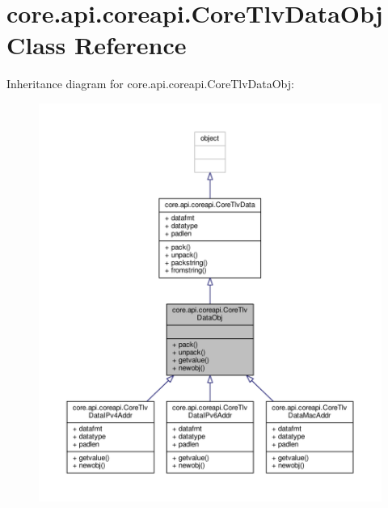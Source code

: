 \hypertarget{classcore_1_1api_1_1coreapi_1_1_core_tlv_data_obj}{\section{core.\+api.\+coreapi.\+Core\+Tlv\+Data\+Obj Class Reference}
\label{classcore_1_1api_1_1coreapi_1_1_core_tlv_data_obj}
}


Inheritance diagram for core.\+api.\+coreapi.\+Core\+Tlv\+Data\+Obj\+:
\nopagebreak
\begin{figure}[H]
\begin{center}
\leavevmode
\includegraphics[width=350pt]{classcore_1_1api_1_1coreapi_1_1_core_tlv_data_obj__inherit__graph}
\end{center}
\end{figure}



